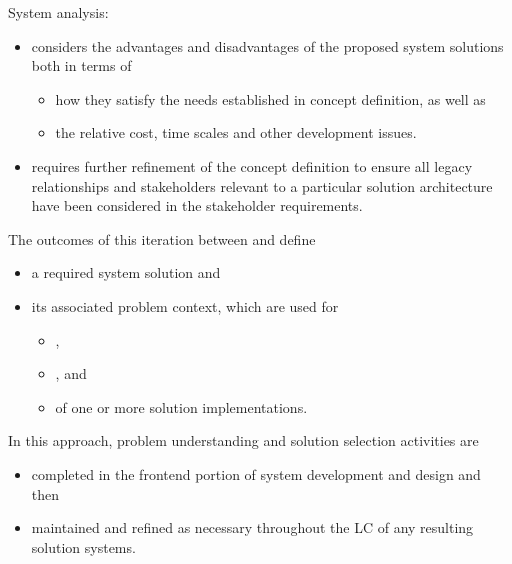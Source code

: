 \documentclass[letterpaper,10pt,english]{jupyterBook}
\begin{document}
\sphinxAtStartPar
System analysis:
\begin{itemize}
\item {} 
\sphinxAtStartPar
considers the advantages and disadvantages of the proposed system solutions both in terms of
\begin{itemize}
\item {} 
\sphinxAtStartPar
how they satisfy the needs established in concept definition, as well as

\item {} 
\sphinxAtStartPar
the relative cost, time scales and other development issues.

\end{itemize}

\item {} 
\sphinxAtStartPar
requires further refinement of the concept definition to ensure all legacy relationships and stakeholders relevant to a particular solution architecture have been considered in the stakeholder requirements.

\end{itemize}

\sphinxAtStartPar
The outcomes of this iteration between  and  define
\begin{itemize}
\item {} 
\sphinxAtStartPar
a required system solution and

\item {} 
\sphinxAtStartPar
its associated problem context, which are used for
\begin{itemize}
\item {} 
\sphinxAtStartPar
{},

\item {} 
\sphinxAtStartPar
{}, and

\item {} 
\sphinxAtStartPar
{} of one or more solution implementations.

\end{itemize}

\end{itemize}

\sphinxAtStartPar
In this approach, problem understanding and solution selection activities are
\begin{itemize}
\item {} 
\sphinxAtStartPar
completed in the front\sphinxhyphen{}end portion of system development and design and then

\item {} 
\sphinxAtStartPar
maintained and refined as necessary throughout the LC of any resulting solution systems.

\end{itemize}
\end{document}
